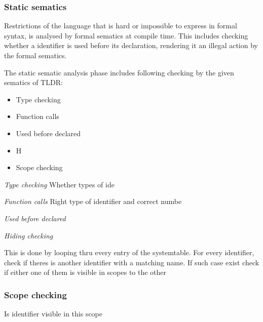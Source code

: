 \subsubsection{Static sematics}

Restrictions of the language that is hard or impossible to express in formal syntax, is analysed by formal sematics at compile time. This includes checking whether a identifier is used before its declaration, rendering it an illegal action by the formal sematics. 

The static sematic analysis phase includes following checking by the given sematics of TLDR:
\begin{itemize}
\item Type checking 
\item Function calls
\item Used before declared
\item H%
\item Scope checking
\end{itemize}

\emph{Type checking}
  Whether types of ide%
  
\emph{Function calls}
  Right type of identifier and correct numbe%

\emph{Used before declared}
  
  
  
\emph{Hiding checking}
  
  This is done by looping thru every entry of the systemtable. For every identifier, check if theres is another identifier with a matching name. If such case exist check if either one of them is visible in scopes to the other

\subsubsection{Scope checking}
  Is identifier visible in this scope
